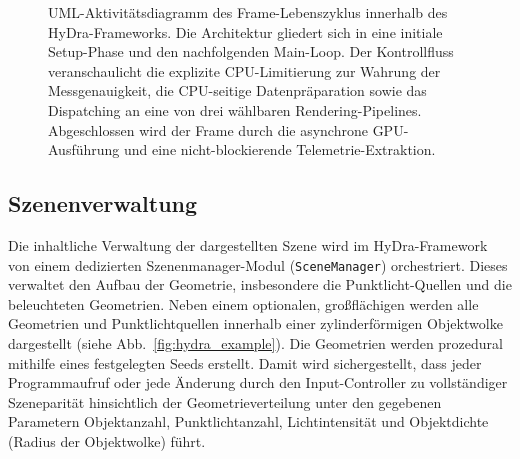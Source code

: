 \begin{figure}[htbp]
{%
    }
    \caption[UML-Aktivitätsdiagramm des Frame-Lebenszyklus]{UML-Aktivitätsdiagramm des Frame-Lebenszyklus innerhalb
    des HyDra-Frameworks.
    Die Architektur gliedert sich in eine initiale Setup-Phase und den nachfolgenden Main-Loop.
    Der Kontrollfluss veranschaulicht die explizite CPU-Limitierung zur Wahrung der Messgenauigkeit, die CPU-seitige
    Datenpräparation sowie das Dispatching an eine von drei wählbaren Rendering-Pipelines.
    Abgeschlossen wird der Frame durch die asynchrone GPU-Ausführung und eine nicht-blockierende
    Telemetrie-Extraktion.}
    \label{fig:render_loop_swimlane}
\end{figure}

\subsection{Szenenverwaltung}
\label{subsec:040103_scene_management}

Die inhaltliche Verwaltung der dargestellten Szene wird im \ac{HyDra}-Framework von einem dedizierten
Szenenmanager-Modul (\texttt{SceneManager}) orchestriert.
Dieses verwaltet den Aufbau der Geometrie, insbesondere die Punktlicht-Quellen und die beleuchteten Geometrien.
Neben einem optionalen, großflächigen  werden alle Geometrien und Punktlichtquellen innerhalb
einer zylinderförmigen Objektwolke dargestellt (siehe Abb.~\ref{fig:hydra_example}).
Die Geometrien werden prozedural mithilfe eines festgelegten Seeds erstellt.
Damit wird sichergestellt, dass jeder Programmaufruf oder jede Änderung durch den Input-Controller zu vollständiger
Szeneparität hinsichtlich der Geometrieverteilung unter den gegebenen Parametern Objektanzahl, Punktlichtanzahl,
Lichtintensität und Objektdichte (Radius der Objektwolke) führt.

